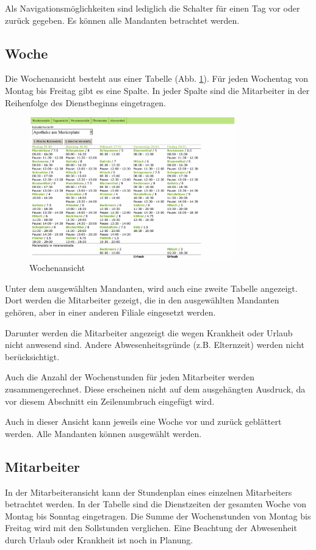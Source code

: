 \documentclass[10pt,a4paper,titlepage,oneside]{article}
\begin{document}
Als Navigationsmöglichkeiten sind lediglich die Schalter für einen Tag vor oder zurück gegeben. Es können alle Mandanten betrachtet werden.





\subsection{Woche}
Die Wochenansicht besteht aus einer Tabelle (Abb. \ref{fig:Wochenansicht}).
Für jeden Wochentag von Montag bis Freitag gibt es eine Spalte. In jeder Spalte sind die Mitarbeiter in der Reihenfolge des Dienstbeginns eingetragen.
\begin{figure}[h]
\centering
\includegraphics[width=0.8\textwidth]{woche-out}
\caption{Wochenansicht}
\label{fig:Wochenansicht}
\end{figure}

Unter dem ausgewählten Mandanten, wird auch eine zweite Tabelle angezeigt. Dort werden die Mitarbeiter gezeigt, die in den ausgewählten Mandanten gehören, aber in einer anderen Filiale eingesetzt werden.

Darunter werden die Mitarbeiter angezeigt die wegen Krankheit oder Urlaub nicht anwesend sind. Andere Abwesenheitsgründe (z.B. Elternzeit) werden nicht berücksichtigt.

Auch die Anzahl der Wochenstunden für jeden Mitarbeiter werden zusammengerechnet. Diese erscheinen nicht auf dem ausgehängten Ausdruck, da vor diesem Abschnitt ein Zeilenumbruch eingefügt wird. 

Auch in dieser Ansicht kann jeweils eine Woche vor und zurück geblättert werden. Alle Mandanten können ausgewählt werden.





\subsection{Mitarbeiter}
In der Mitarbeiteransicht kann der Stundenplan eines einzelnen Mitarbeiters betrachtet werden.
In der Tabelle sind die Dienstzeiten der gesamten Woche von Montag bis Sonntag eingetragen.
Die Summe der Wochenstunden von Montag bis Freitag wird mit den Sollstunden verglichen. Eine Beachtung der Abwesenheit durch Urlaub oder Krankheit ist noch in Planung. %
\end{document}
